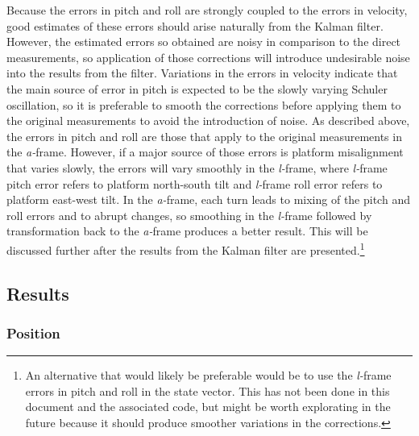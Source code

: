 \documentclass[12pt,twoside,english,12pt,twoside,english]{article}\usepackage[]{graphicx}\usepackage[]{color}
\let\OrgIndex\index
\renewcommand*{\index}[1]{\OrgIndex{#1}}
\begin{document}
Because the errors in pitch
and roll are strongly coupled to the errors
in velocity, good estimates of these errors should arise naturally
from the Kalman filter. However, the estimated
errors so obtained are noisy in comparison
to the direct measurements, so application of those corrections will
introduce undesirable noise
into the results from the filter. Variations in the errors in velocity
indicate that the main source of error in pitch is expected to be
the slowly varying Schuler oscillation,
so it is preferable to smooth the corrections before applying them
to the original measurements to avoid the introduction of noise. As
described above, the errors in pitch and roll are those that apply
to the original measurements in the \emph{a-}frame.
However, if a major source of those errors is platform misalignment
that varies slowly, the errors will vary smoothly in the \emph{l-}frame,
where \emph{l-}frame pitch error refers to platform
north-south tilt and \emph{l-}frame roll error refers to platform
east-west tilt. In the \emph{a-}frame, each turn leads to mixing of
the pitch and roll errors and to abrupt changes, so smoothing
in the \emph{l-}frame followed by transformation
back to the \emph{a-}frame produces a better result. This will be
discussed further after the results from the Kalman filter are presented.\footnote{An alternative that would likely be preferable would be to use the
\emph{l-}frame errors
in pitch and roll in the state vector. This has
not been done in this document and the associated code, but might
be worth explorating in the future because it should produce smoother
variations in the corrections.}





\clearpage

\subsection{Results}


\subsubsection{Position}
\end{document}

